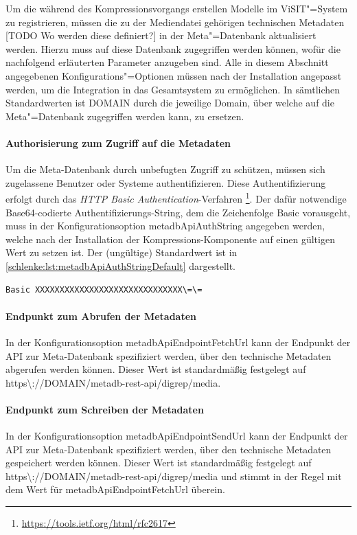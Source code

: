 Um die während des Kompressionsvorgangs erstellen Modelle im ViSIT"=System zu registrieren, müssen die zu der Mediendatei gehörigen technischen Metadaten [TODO Wo werden diese definiert?] in der Meta"=Datenbank aktualisiert werden. Hierzu muss auf diese Datenbank zugegriffen werden können, wofür die nachfolgend erläuterten Parameter anzugeben sind. Alle in diesem Abschnitt angegebenen Konfigurations"=Optionen müssen nach der Installation angepasst werden, um die Integration in das Gesamtsystem zu ermöglichen. In sämtlichen Standardwerten ist {\ttfamily DOMAIN} durch die jeweilige Domain, über welche auf die Meta"=Datenbank zugegriffen werden kann, zu ersetzen.

\paragraph{Authorisierung zum Zugriff auf die Metadaten} Um die Meta-Datenbank durch unbefugten Zugriff zu schützen, müssen sich zugelassene Benutzer oder Systeme authentifizieren. Diese Authentifizierung erfolgt durch das \emph{HTTP Basic Authentication}-Verfahren \footnote{\url{https://tools.ietf.org/html/rfc2617}}. Der dafür notwendige Base64-codierte Authentifizierungs-String, dem die Zeichenfolge {\ttfamily Basic } vorausgeht, muss in der Konfigurationsoption {\ttfamily metadb\-Api\-Auth\-String} angegeben werden, welche nach der Installation der Kompressions-Komponente auf einen gültigen Wert zu setzen ist. Der (ungültige) Standardwert ist in \autoref{schlenke:lst:metadbApiAuthStringDefault} dargestellt.

\begin{lstlisting}[caption={Standardwert für die Konfigurationsoption {\ttfamily metadb\-Api\-Auth\-String}},label=schlenke:lst:metadbApiAuthStringDefault]
	Basic XXXXXXXXXXXXXXXXXXXXXXXXXXXXXX\=\=
\end{lstlisting}

\paragraph{Endpunkt zum Abrufen der Metadaten} In der Konfigurationsoption {\ttfamily metadb\-Api\-Endpoint\-Fetch\-Url} kann der Endpunkt der API zur Meta-Datenbank spezifiziert werden, über den technische Metadaten abgerufen werden können. Dieser Wert ist standardmäßig festgelegt auf {\ttfamily https\textbackslash ://DOMAIN/metadb-rest-api/digrep/media}.

\paragraph{Endpunkt zum Schreiben der Metadaten} In der Konfigurationsoption {\ttfamily metadb\-Api\-Endpoint\-Send\-Url} kann der Endpunkt der API zur Meta-Datenbank spezifiziert werden, über den technische Metadaten gespeichert werden können. Dieser Wert ist standardmäßig festgelegt auf {\ttfamily https\textbackslash ://DOMAIN/metadb-rest-api/digrep/media} und stimmt in der Regel mit dem Wert für {\ttfamily metadb\-Api\-Endpoint\-Fetch\-Url} überein.

